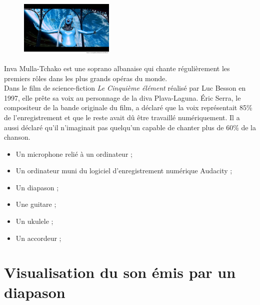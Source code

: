 
\begin{tcolorbox}[colback=orange!5!white,colframe=orange!75!black,title= Scénario:]
\begin{figure}
\vspace{-0.6cm}
    \centering
     \includegraphics[width=0.4\textwidth]{Images/TP/TP8/Cinquieme_element.jpg}
   \end{figure}
Inva Mulla-Tchako est une soprano albanaise qui chante régulièrement les premiers rôles dans les plus grands opéras du monde.\\
Dans le film de science-fiction \textit{Le Cinquième élément} réalisé par Luc Besson en 1997, elle prête sa voix au personnage de la diva Plava-Laguna. Éric Serra, le compositeur de la bande originale du film, a déclaré que la voix représentait 85\% de l'enregistrement et que le reste avait dû être travaillé numériquement. Il a aussi déclaré qu'il n'imaginait pas quelqu'un capable de chanter plus de 60\% de la chanson.\\

\end{tcolorbox}


\begin{mdframed}[style=autreexo]
\textbf{}
\begin{itemize}
    \item Un microphone relié à un ordinateur ;
    \item Un ordinateur muni du logiciel d'enregistrement numérique Audacity ;
    \item Un diapason ;
    \item Une guitare ;
    \item Un ukulele ;
    \item Un accordeur ;
\end{itemize}
\end{mdframed}
 
\newpage

\section{Visualisation du son émis par un diapason}

